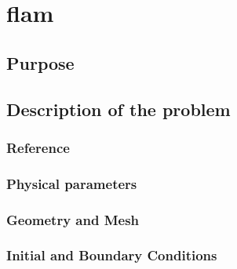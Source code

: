 \chapter{flam}
%

%
\section{Purpose}
%

%
\section{Description of the problem}
%

%
%
\subsection{Reference}
%

%
%
\subsection{Physical parameters}
%

%
%
\subsection{Geometry and Mesh}
%

%
%
\subsection{Initial and Boundary Conditions}
%

%
%

